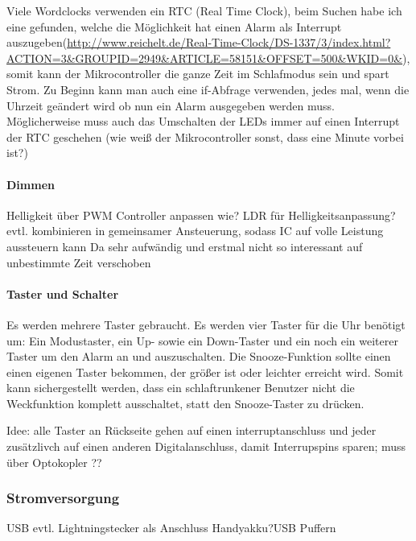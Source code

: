 \documentclass[11pt,a4paper,ngerman]{article}
\begin{document}
Viele Wordclocks verwenden ein RTC (Real Time Clock), beim Suchen habe ich eine gefunden, welche die Möglichkeit hat einen Alarm als Interrupt auszugeben(\url{http://www.reichelt.de/Real-Time-Clock/DS-1337/3/index.html?ACTION=3&GROUPID=2949&ARTICLE=58151&OFFSET=500&WKID=0&}), somit kann der Mikrocontroller die ganze Zeit im Schlafmodus sein und spart Strom. Zu Beginn kann man auch eine if-Abfrage verwenden, jedes mal, wenn die Uhrzeit geändert wird ob nun ein Alarm ausgegeben werden muss. Möglicherweise muss auch das Umschalten der LEDs immer auf einen Interrupt der RTC geschehen (wie weiß der Mikrocontroller sonst, dass eine Minute vorbei ist?)


\paragraph{Dimmen}
Helligkeit über PWM Controller anpassen wie?
LDR für Helligkeitsanpassung? evtl. kombinieren in gemeinsamer Ansteuerung, sodass IC auf volle Leistung aussteuern kann
Da sehr aufwändig und erstmal nicht so interessant auf unbestimmte Zeit verschoben
\paragraph{Taster und Schalter}
Es werden mehrere Taster gebraucht. Es werden vier Taster für die Uhr benötigt um: Ein Modustaster, ein Up- sowie ein Down-Taster und ein noch ein weiterer Taster um den Alarm an und auszuschalten. Die Snooze-Funktion sollte einen einen eigenen Taster bekommen, der größer ist oder leichter erreicht wird. Somit kann sichergestellt werden, dass ein schlaftrunkener Benutzer nicht die Weckfunktion komplett ausschaltet, statt den Snooze-Taster zu drücken.

Idee: alle Taster an Rückseite gehen auf einen interruptanschluss und jeder zusätzlivch auf einen anderen Digitalanschluss, damit Interrupspins sparen; muss über Optokopler ??
\subsubsection{Stromversorgung}
USB evtl. Lightningstecker als Anschluss       
Handyakku?USB Puffern\cite{RTCDatenblatt}


\end{document}
